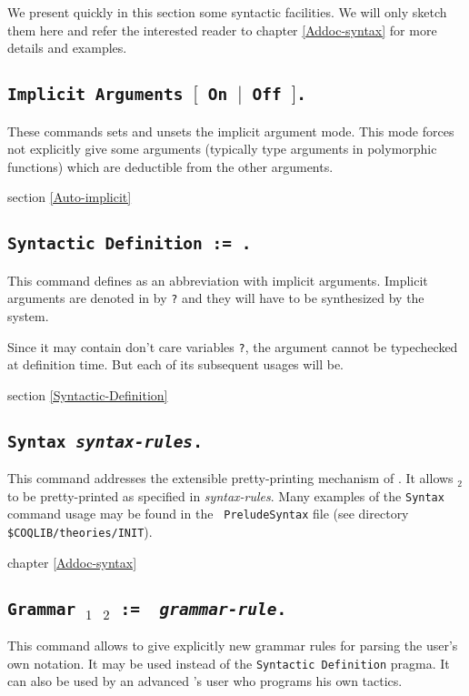 We present quickly in this section some syntactic facilities.
We will only sketch them here and refer the
interested reader to chapter \ref{Addoc-syntax} for more details and
examples.

\subsection{\tt Implicit Arguments $[$ On $|$ Off $]$.}

These commands sets and unsets the implicit argument mode. This mode
forces not explicitly give some arguments (typically type arguments in
polymorphic functions) which are deductible from the other arguments.

\SeeAlso section \ref{Auto-implicit}

\subsection{\tt Syntactic Definition {\ident} := \term.}
This command defines {\ident} as an
abbreviation with implicit arguments. Implicit arguments are denoted
in {\term} by {\tt ?} and they will have to be synthesized by the
system.

\Rem Since it may contain don't care variables {\tt ?}, the argument
{\term} cannot be typechecked at
definition time. But each of its subsequent usages will be.

\SeeAlso section \ref{Syntactic-Definition}


\subsection{\tt Syntax {\ident} {\rm\sl syntax-rules}.}
This command addresses the extensible
pretty-printing mechanism of \Coq. It allows {\ident$_2$} to be 
pretty-printed as specified in {\rm\sl syntax-rules}. Many examples
of the {\tt Syntax} command usage may be found in the {\tt
  PreludeSyntax} file (see directory {\tt \$COQLIB/theories/INIT}).

\SeeAlso chapter \ref{Addoc-syntax}

\subsection{\tt Grammar \ident$_1$ \ident$_2$ := {\rm\sl
    grammar-rule}.}
This command allows to give explicitly new grammar rules for parsing
the user's own notation.  It may be used instead of the {\tt Syntactic
Definition} pragma.  It can also be used by an advanced \Coq's user
who programs his own tactics.

